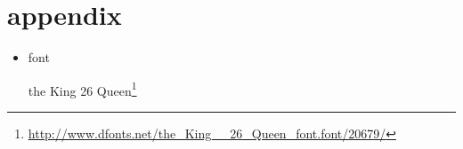 \section{appendix}
\begin{frame}[allowframebreaks]
	\frametitlesec
	\begin{itemize}
		\item font

			{\theking the King 26 Queen}\footnote{\url{http://www.dfonts.net/the_King__26_Queen_font.font/20679/}}
	\end{itemize}
\end{frame}
\begin{frame}[allowframebreaks]
	\frametitlesec
	\nocite{*}
	
	
\end{frame}
